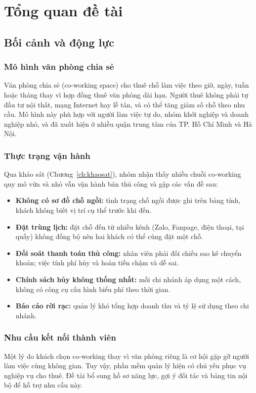 \chapter{Tổng quan đề tài}
\label{ch:tongquan}

\section{Bối cảnh và động lực}
\label{sec:boicanh}

\subsection{Mô hình văn phòng chia sẻ}
Văn phòng chia sẻ (co-working space) cho thuê chỗ làm việc theo giờ, ngày, tuần hoặc tháng thay vì hợp đồng thuê văn phòng dài hạn. Người thuê không phải tự đầu tư nội thất, mạng Internet hay lễ tân, và có thể tăng giảm số chỗ theo nhu cầu. Mô hình này phù hợp với người làm việc tự do, nhóm khởi nghiệp và doanh nghiệp nhỏ, và đã xuất hiện ở nhiều quận trung tâm của TP. Hồ Chí Minh và Hà Nội.

\subsection{Thực trạng vận hành}
Qua khảo sát (Chương~\ref{ch:khaosat}), nhóm nhận thấy nhiều chuỗi co-working quy mô vừa và nhỏ vẫn vận hành bán thủ công và gặp các vấn đề sau:
\begin{itemize}
    \item \textbf{Không có sơ đồ chỗ ngồi:} tình trạng chỗ ngồi được ghi trên bảng tính, khách không biết vị trí cụ thể trước khi đến.
    \item \textbf{Đặt trùng lịch:} đặt chỗ đến từ nhiều kênh (Zalo, Fanpage, điện thoại, tại quầy) không đồng bộ nên hai khách có thể cùng đặt một chỗ.
    \item \textbf{Đối soát thanh toán thủ công:} nhân viên phải đối chiếu sao kê chuyển khoản; việc tính phí hủy và hoàn tiền chậm và dễ sai.
    \item \textbf{Chính sách hủy không thống nhất:} mỗi chi nhánh áp dụng một cách, không có công cụ cấu hình biểu phí theo thời gian.
    \item \textbf{Báo cáo rời rạc:} quản lý khó tổng hợp doanh thu và tỷ lệ sử dụng theo chi nhánh.
\end{itemize}

\subsection{Nhu cầu kết nối thành viên}
Một lý do khách chọn co-working thay vì văn phòng riêng là cơ hội gặp gỡ người làm việc cùng không gian. Tuy vậy, phần mềm quản lý hiện có chủ yếu phục vụ nghiệp vụ cho thuê. Đề tài bổ sung hồ sơ năng lực, gợi ý đối tác và bảng tin nội bộ để hỗ trợ nhu cầu này.

